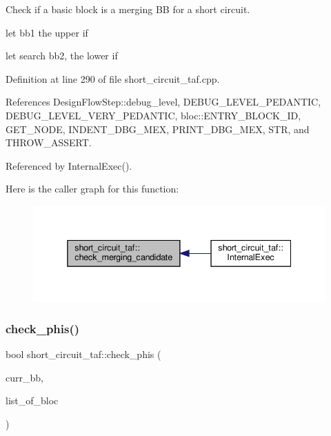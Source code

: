 Check if a basic block is a merging BB for a short circuit. 

let bb1 the upper if

let search bb2, the lower if 

Definition at line 290 of file short\+\_\+circuit\+\_\+taf.\+cpp.



References Design\+Flow\+Step\+::debug\+\_\+level, D\+E\+B\+U\+G\+\_\+\+L\+E\+V\+E\+L\+\_\+\+P\+E\+D\+A\+N\+T\+IC, D\+E\+B\+U\+G\+\_\+\+L\+E\+V\+E\+L\+\_\+\+V\+E\+R\+Y\+\_\+\+P\+E\+D\+A\+N\+T\+IC, bloc\+::\+E\+N\+T\+R\+Y\+\_\+\+B\+L\+O\+C\+K\+\_\+\+ID, G\+E\+T\+\_\+\+N\+O\+DE, I\+N\+D\+E\+N\+T\+\_\+\+D\+B\+G\+\_\+\+M\+EX, P\+R\+I\+N\+T\+\_\+\+D\+B\+G\+\_\+\+M\+EX, S\+TR, and T\+H\+R\+O\+W\+\_\+\+A\+S\+S\+E\+RT.



Referenced by Internal\+Exec().

Here is the caller graph for this function\+:
\nopagebreak
\begin{figure}[H]
\begin{center}
\leavevmode
\includegraphics[width=338pt]{dd/d1c/classshort__circuit__taf_a5d3b7d29cc59c1bd90bdb77872d90c77_icgraph}
\end{center}
\end{figure}
\mbox{\label{classshort__circuit__taf_ae6d5913aa8df5e681f440a8ed11981a2}} 
\subsubsection{\texorpdfstring{check\+\_\+phis()}{check\_phis()}}
{\footnotesize\ttfamily bool short\+\_\+circuit\+\_\+taf\+::check\+\_\+phis (\begin{DoxyParamCaption}\item[{unsigned int}]{curr\+\_\+bb,  }\item[{std\+::map$<$ unsigned int, bloc\+Ref $>$ \&}]{list\+\_\+of\+\_\+bloc }\end{DoxyParamCaption})\hspace{0.3cm}{\ttfamily [private]}}



